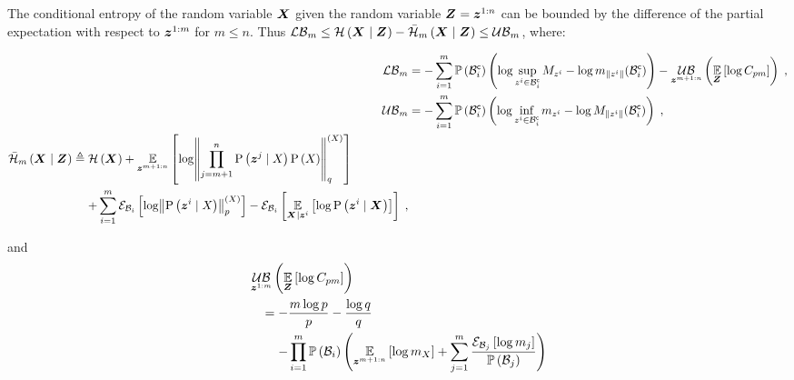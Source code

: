 \begin{propositionE}
	\label{thm:entropy_high_dim_bounds}
	The conditional entropy of the random variable $\boldsymbol X_{}$ given the random variable $\boldsymbol Z_{}=\boldsymbol z_{}^{1:n}$ can be bounded by the difference of the partial expectation with respect to $\boldsymbol z_{}^{1:m}$ for $m\leq n$. Thus $\operatorname*{\mathcal{LB}}_m\leq\mathcal{H}\left({\boldsymbol X_{}}\mid{\ensuremath{\boldsymbol Z_{}}}\right)-\bar{\mathcal{H}}_{m}\left({\boldsymbol X_{}}\mid{\ensuremath{\boldsymbol Z_{}}}\right)\leq\operatorname*{\mathcal{UB}}_m$, where:
	\begin{small}
		\begin{subequations}
			\begin{align}
				\lowerbound\nolimits_m & =-\sum_{i=1}^m\measure{\stcompI{\subSpace}{i}}\left(\log\sup_{\observation{}{i}\in\stcompI{\subSpace}{i}}M_{\observation{}{i}}-\log m_{\norm{\observation{}{i}}}(\stcompI{\subSpace}{i})\right)-\upperbound_{\observationRV{}{m+1:n}}\left(\expectation{\log C_{pm}}{\observationsRV{}}\right)\;,
				\\
				\upperbound\nolimits_m  & =-\sum_{i=1}^m\measure{\stcompI{\subSpace}{i}}\left(\log\inf_{\observation{}{i}\in\stcompI{\subSpace}{i}}m_{\observation{}{i}}-\log M_{\norm{\observation{}{i}}}(\stcompI{\subSpace}{i})\right)\;,\\
				\begin{split} \simplecondEntropy{\statesRV{}}{\observationsRV{}}{m}&\triangleq\entropy{\statesRV{}}+\expectation{\log\pnorm{\prod_{j=m+1}^n\probcond{\observationRV{}{j}}{\states{}}\prob{\states{}}}{q}{\states{}}}{\observationRV{}{m+1:n}}                    \\
					&\phantomeq+\sum_{i=1}^m\partialexpectation{\log\pnorm{\probcond{\observationRV{}{i}}{\states{}}}{p}{\states{}}}{\subSpace_i}-\partialexpectation{\expectation{\log\probcond{\observationRV{}{i}}{\statesRV{}}}{\statesRV{}\mid\observationRV{}{i}}}{\subSpace_i}\;,
				\end{split}
			\end{align}
		\end{subequations}
	\end{small}
	and
	\begin{equation}
		\begin{split}
			& \upperbound_{\observationRV{}{1:m}}\left(\expectation{\log C_{pm}}{\observationsRV{}}\right)\\
			& \quad=-\frac{m\log p}{p}-\frac{\log q}{q}\\
			& \quad\phantomeq-\prod_{i=1}^m\measure{\subSpace_i}\Biggl(\expectation{\log m_{\states{}}}{\observationRV{}{m+1:n}}+\sum_{j=1}^m\frac{\partialexpectation{\log m_j}{\subSpace_j}}{\measure{\subSpace_j}}\Biggr) \\

\end{split}
\end{equation}
\end{propositionE}
